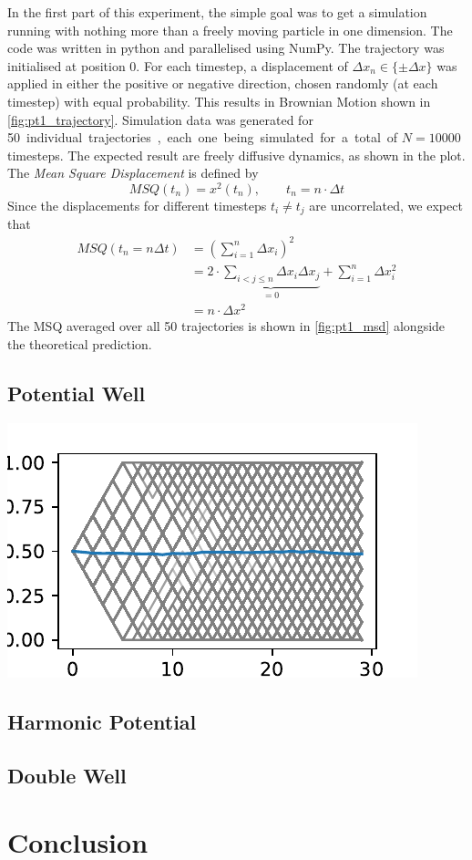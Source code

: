 \documentclass[
    parskip=half, 
    twoside=false,
    twocolumn=true,
    fontsize=11pt,
]{scrarticle}
\begin{document}
In the first part of this experiment, the simple goal was to get a simulation running with nothing more than a freely moving particle in one dimension. The code was written in python and parallelised using NumPy. The trajectory was initialised at position \SI{0}{}. For each timestep, a displacement of $\Delta x_n \in \{\pm \Delta x\}$ was applied in either the positive or negative direction, chosen randomly (at each timestep) with equal probability. This results in Brownian Motion shown in \autoref{fig:pt1_trajectory}. Simulation data was generated for \SI{50} individual trajectories, each one being simulated for a total of $N=\SI{10000}{}$ timesteps. The expected result are freely diffusive dynamics, as shown in the plot. The \textit{Mean Square Displacement} is defined by
\begin{equation}
 MSQ(t_n) = x^2(t_n), \qquad t_n = n \cdot \Delta t
\end{equation}
Since the displacements for different timesteps $t_i\neq t_j$ are uncorrelated, we expect that
\begin{align}
 MSQ(t_n = n \Delta t) &= \left(\sum_{i=1}^n \Delta x_i\right)^2 \\&= 2 \cdot \underbrace{\sum_{i<j\leq n} \Delta x_i \Delta x_j}_{=0} + \sum_{i=1}^n \Delta x_i^2 \\ &= n \cdot \Delta x^2
\end{align}
The MSQ averaged over all \SI{50}{} trajectories is shown in \autoref{fig:pt1_msd} alongside the theoretical prediction.


\subsection{Potential Well}
\includegraphics{figures/02 time evolution.pdf}

\subsection{Harmonic Potential}

\subsection{Double Well}


\pagebreak
\section{Conclusion}


\nocite{*}
\printbibliography
\end{document}
